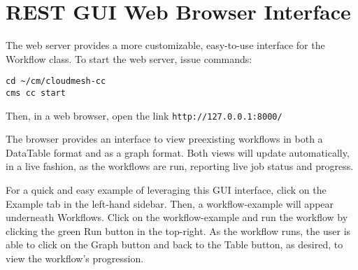 
\section{REST GUI Web Browser
Interface}\label{rest-gui-web-browser-interface}

The web server provides a more customizable, easy-to-use interface for
the Workflow class. To start the web server, issue commands:

\begin{verbatim}
cd ~/cm/cloudmesh-cc
cms cc start
\end{verbatim}

Then, in a web browser, open the link \verb|http://127.0.0.1:8000/|

The browser provides an interface to view preexisting workflows in both
a DataTable format and as a graph format. Both views will update
automatically, in a live fashion, as the workflows are run, reporting
live job status and progress.

For a quick and easy example of leveraging this GUI interface, click on
the Example tab in the left-hand sidebar. Then, a workflow-example will
appear underneath Workflows. Click on the workflow-example and run the
workflow by clicking the green Run button in the top-right. As the
workflow runs, the user is able to click on the Graph button and back to
the Table button, as desired, to view the workflow's progression.
